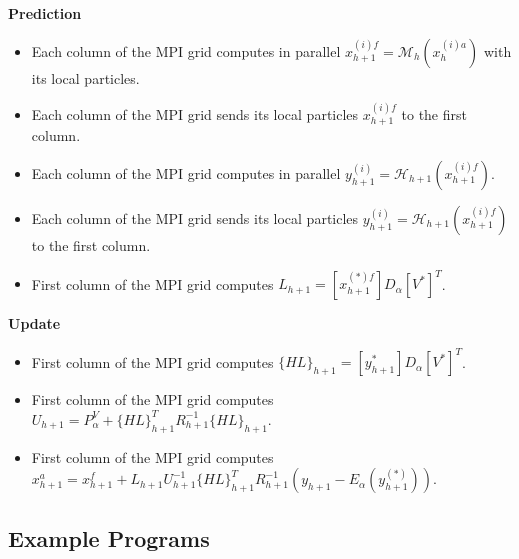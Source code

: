   \par  \textbf{Prediction}

   \begin{itemize}

  \item Each column  of the MPI grid computes in parallel  $ x_{h+1}^{(i)f} = \mathcal{M}_{h}(x_{h}^{(i)a})$ with its local particles.

  \item Each column of the MPI grid sends its local particles  $ x_{h+1}^{(i)f}$ to the first column.

   \item Each column of the MPI grid  computes in parallel  $ y_{h+1}^{(i)} = \mathcal{H}_{h+1}(x_{h+1}^{(i)f})$.

    \item Each column of the MPI grid sends its local particles   $ y_{h+1}^{(i)} = \mathcal{H}_{h+1}(x_{h+1}^{(i)f})$ to the first column.

  \item First column  of the MPI grid computes  $ L_{h+1} = [x_{h+1}^{(*)f}]D_\alpha [V^*]^T $.


 \end{itemize}

 \par  \textbf{Update}\\

 \begin{itemize}

 \item First column  of the MPI grid computes $ \{HL\}_{h+1} = [y_{h+1}^{*}]D_\alpha [V^*]^T$.

 \item  First column  of the MPI grid computes  $ U_{h+1} = P_{\alpha}^V +  \{HL\}_{h+1}^T R_{h+1}^{-1} \{HL\}_{h+1}$.

  \item First column  of the MPI grid computes $ x_{h+1}^a = x_{h+1}^f + L_{h+1}U_{h+1}^{-1}\{HL\}_{h+1}^T R_{h+1}^{-1} (y_{h+1}-E_\alpha(y_{h+1}^{(*)}))$.\\

 \end{itemize}



\hypertarget{par-par-ep}{}\subsection{Example Programs}\label{par-par-ep}


